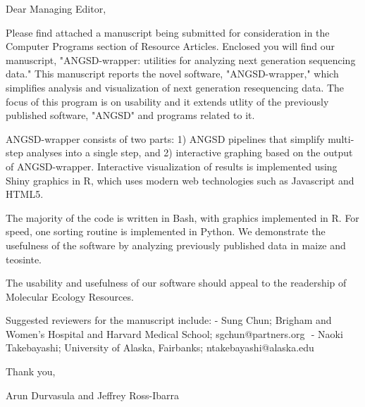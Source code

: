 Dear Managing Editor,

Please find attached a manuscript being submitted for consideration in the Computer Programs section of Resource Articles. Enclosed you will find our manuscript, "ANGSD-wrapper: utilities for analyzing next generation sequencing data." This manuscript reports the novel software, "ANGSD-wrapper," which simplifies analysis and visualization of next generation resequencing data. The focus of this program is on usability and it extends utlity of the previously published software, "ANGSD" and programs related to it.

ANGSD-wrapper consists of two parts: 1) ANGSD pipelines that simplify multi-step analyses into a single step, and 2) interactive graphing based on the output of ANGSD-wrapper. Interactive visualization of results is implemented using Shiny graphics in R, which uses modern web technologies such as Javascript and HTML5. 

The majority of the code is written in Bash, with graphics implemented in R. For speed, one sorting routine is implemented in Python.
We demonstrate the usefulness of the software by analyzing previously published data in maize and teosinte. 

The usability and usefulness of our software should appeal to the readership of Molecular Ecology Resources.

Suggested reviewers for the manuscript include:
	- Sung Chun; Brigham and Women’s Hospital and Harvard Medical School; sgchun@partners.org 
	- Naoki Takebayashi; University of Alaska, Fairbanks; ntakebayashi@alaska.edu
	

Thank you,

Arun Durvasula and Jeffrey Ross-Ibarra